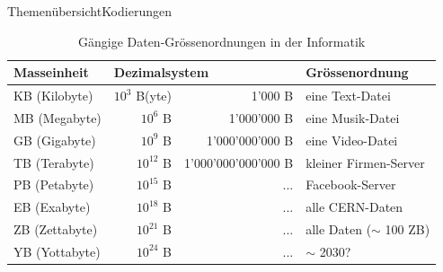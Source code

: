 \begin{frame}{Themenübersicht}{Kodierungen}
    \begin{table}[H]
        \footnotesize
        \centering
        \begin{tabular}{@{}l|rr|l@{}}
            \toprule
            \textbf{Masseinheit} & \multicolumn{2}{l|}{\textbf{Dezimalsystem}} & Grössenordnung                                   \\ \midrule
            KB (Kilobyte)        & $10^3$ B(yte)                               & 1'000 B             & eine Text-Datei            \\
            MB (Megabyte)        & $10^6$ B                                    & 1'000'000 B         & eine Musik-Datei           \\
            GB (Gigabyte)        & $10^9$ B                                    & 1'000'000'000 B     & eine Video-Datei           \\
            TB (Terabyte)        & $10^{12}$ B                                 & 1'000'000'000'000 B & kleiner Firmen-Server      \\
            PB (Petabyte)        & $10^{15}$ B                                 & ...                 & Facebook-Server            \\
            EB (Exabyte)         & $10^{18}$ B                                 & ...                 & alle CERN-Daten            \\
            ZB (Zettabyte)       & $10^{21}$ B                                 & ...                 & alle Daten ($\sim$ 100 ZB) \\
            YB (Yottabyte)       & $10^{24}$ B                                 & ...                 & $\sim$ 2030?               \\ \bottomrule
        \end{tabular}
        \caption*{Gängige Daten-Grössenordnungen in der Informatik}
    \end{table}
\end{frame}

